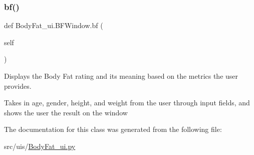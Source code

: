 \subsubsection{\texorpdfstring{bf()}{bf()}}
{\footnotesize\ttfamily def Body\+Fat\+\_\+ui.\+B\+F\+Window.\+bf (\begin{DoxyParamCaption}\item[{}]{self }\end{DoxyParamCaption})}



Displays the Body Fat rating and its meaning based on the metrics the user provides. 

Takes in age, gender, height, and weight from the user through input fields, and shows the user the result on the window 

The documentation for this class was generated from the following file\+:\begin{DoxyCompactItemize}
\item 
src/uis/\hyperlink{_body_fat__ui_8py}{Body\+Fat\+\_\+ui.\+py}\end{DoxyCompactItemize}
